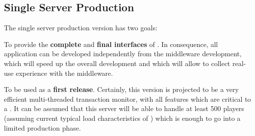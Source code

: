 \documentclass[a4paper, 10pt]{book}
\begin{document}

                                \subsection{Single Server Production}
                                \label{sec:single-serv-prod}

                                The single server production version has two goals:
                                \begin{description}
                                    \item To provide the \textbf{complete} and \textbf{final interfaces}
                                        of \SYNEIGHT. In consequence, all application can be developed
                                        independently from the middleware development, which will speed up
                                        the overall development and which will allow to collect real-use
                                        experience with the middleware.
                                    \item To be used as a \textbf{first release}. Certainly, this version
                                        is projected to be a very efficient multi-threaded transaction
                                        monitor, with all features which are critical to a \MMORG. It can be
                                        assumed that this server will be able to handle at least 500 players
                                        (assuming current typical load characteristics of \MMORGS) which is
                                        enough to go into a limited production phase.
                                        \end{description}
\end{document}
